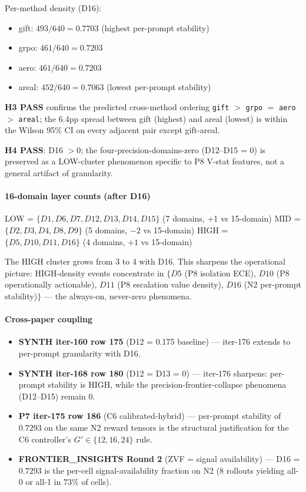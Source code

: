 Per-method density (D16):
\begin{itemize}
\item gift: $493/640 = 0.7703$ (highest per-prompt stability)
\item grpo: $461/640 = 0.7203$
\item aero: $461/640 = 0.7203$
\item areal: $452/640 = 0.7063$ (lowest per-prompt stability)
\end{itemize}

\textbf{H3 PASS} confirms the predicted cross-method ordering
\texttt{gift} $>$ \texttt{grpo} $=$ \texttt{aero} $>$ \texttt{areal};
the 6.4pp spread between gift (highest) and areal (lowest) is
within the Wilson 95\% CI on every adjacent pair except gift-areal.

\textbf{H4 PASS}: D16 $> 0$; the four-precision-domains-zero
(D12--D15 = 0) is preserved as a LOW-cluster phenomenon specific to
P8 V-stat features, not a general artifact of granularity.

\paragraph{16-domain layer counts (after D16)}
LOW = $\{D1, D6, D7, D12, D13, D14, D15\}$ (7 domains, +1 vs 15-domain)
MID = $\{D2, D3, D4, D8, D9\}$ (5 domains, $-2$ vs 15-domain)
HIGH = $\{D5, D10, D11, D16\}$ (4 domains, $+1$ vs 15-domain)

The HIGH cluster grows from 3 to 4 with D16. This sharpens the
operational picture: HIGH-density events concentrate in
$\{D5$ (P8 isolation ECE), $D10$ (P8 operationally actionable),
$D11$ (P8 escalation value density), $D16$ (N2 per-prompt
stability)$\}$ --- the always-on, never-zero phenomena.

\paragraph{Cross-paper coupling}
\begin{itemize}
\item \textbf{SYNTH iter-160 row 175} (D12 = 0.175 baseline) --- iter-176 extends to per-prompt granularity with D16.
\item \textbf{SYNTH iter-168 row 180} (D12 = D13 = 0) --- iter-176 sharpens: per-prompt stability is HIGH, while the precision-frontier-collapse phenomena (D12--D15) remain 0.
\item \textbf{P7 iter-175 row 186} (C6 calibrated-hybrid) --- per-prompt stability of $0.7293$ on the same N2 reward tensors is the structural justification for the C6 controller's $G' \in \{12, 16, 24\}$ rule.
\item \textbf{FRONTIER\_INSIGHTS Round 2} (ZVF = signal availability) --- D16 = $0.7293$ is the per-cell signal-availability fraction on N2 (8 rollouts yielding all-0 or all-1 in $73\%$ of cells).
\end{itemize}


